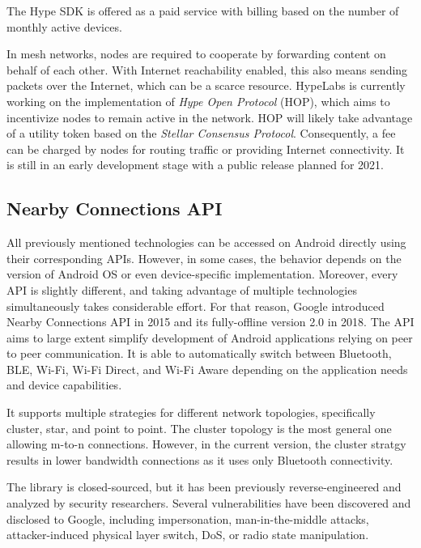 \documentclass[conference,compsoc]{IEEEtran}
\begin{document}
The Hype SDK is offered as a paid service with billing based on the number of monthly active devices.

In mesh networks, nodes are required to cooperate by forwarding content on behalf of each other. With Internet reachability enabled, this also means sending packets over the Internet, which can be a scarce resource. HypeLabs is currently working on the implementation of \textit{Hype Open Protocol} (HOP), which aims to incentivize nodes to remain active in the network. HOP will likely take advantage of a utility token based on the \textit{Stellar Consensus Protocol}. Consequently, a fee can be charged by nodes for routing traffic or providing Internet connectivity. It is still in an early development stage with a public release planned for 2021. \cite{hop}


\subsection{Nearby Connections API}

All previously mentioned technologies can be accessed on Android directly using their corresponding APIs. However, in some cases, the behavior depends on the version of Android OS or even device-specific implementation. Moreover, every API is slightly different, and taking advantage of multiple technologies simultaneously takes considerable effort. For that reason, Google introduced Nearby Connections API in 2015 and its fully-offline version 2.0 in 2018. \cite{nearby2} The API aims to large extent simplify development of Android applications relying on peer to peer communication. It is able to automatically switch between Bluetooth, BLE, Wi-Fi, Wi-Fi Direct, and Wi-Fi Aware depending on the application needs and device capabilities.

It supports multiple strategies for different network topologies, specifically cluster, star, and point to point. The cluster topology is the most general one allowing m-to-n connections. However, in the current version, the cluster stratgy results in lower bandwidth connections as it uses only Bluetooth connectivity.

The library is closed-sourced, but it has been previously reverse-engineered and analyzed by security researchers. Several vulnerabilities have been discovered and disclosed to Google, including impersonation, man-in-the-middle attacks, attacker-induced physical layer switch, DoS, or radio state manipulation. \cite{nearbytr}
\end{document}

